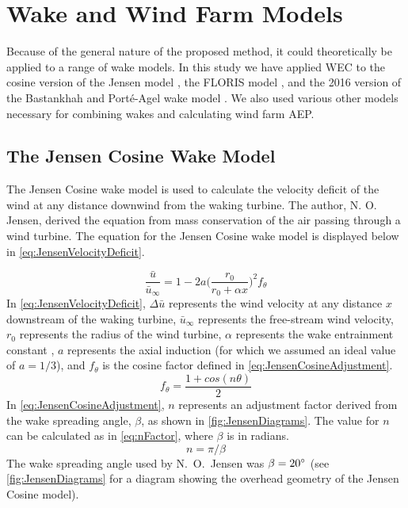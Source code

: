 \documentclass[a4paper]{jpconf}
\begin{document}
\section{Wake and Wind Farm Models}
Because of the general nature of the proposed method, it could theoretically be applied to a range of wake models. In this study we have applied WEC to the cosine version of the Jensen model \cite{jensen1983}, the FLORIS model \cite{gebraad2014,thomas2017-Improving-FLORIS}, and the 2016 version of the Bastankhah and Port\'e-Agel wake model \cite{bastankhah2016}. We also used various other models necessary for combining wakes and calculating wind farm AEP.

\subsection{The Jensen Cosine Wake Model}
The Jensen Cosine wake model is used to calculate the velocity deficit of the wind at any distance downwind from the waking turbine. The author, N. O. Jensen, derived the equation from mass conservation of the air passing through a wind turbine. The equation for the Jensen Cosine wake model is displayed below in \cref{eq:JensenVelocityDeficit}.

\begin{equation}
    \frac{ \bar{u}}{\bar{u}_\infty} = 1 - 2a \bigg(\frac{r_0}{r_0 + \alpha x} \bigg)^2 f_\theta 
    \label{eq:JensenVelocityDeficit}
\end{equation}
%
In \cref{eq:JensenVelocityDeficit}, $\Delta \bar{u}$ represents the wind velocity at any distance $x$ downstream of the waking turbine, $\bar{u}_\infty$ represents the free-stream wind velocity, $r_0$ represents the radius of the wind turbine, $\alpha$ represents the wake entrainment constant \cite{jensen1983}, $a$ represents the axial induction (for which we assumed an ideal value of $a = 1/3$), and $f_\theta$ is the cosine factor defined in \cref{eq:JensenCosineAdjustment}.
%
\begin{equation}
f_\theta = \frac{1 + cos(n\theta)}{2}
\label{eq:JensenCosineAdjustment}
\end{equation}
%
In \cref{eq:JensenCosineAdjustment}, $n$ represents an adjustment factor derived from the wake spreading angle, $\beta$, as shown in \cref{fig:JensenDiagrams}. The value for $n$ can be calculated as in \cref{eq:nFactor}, where $\beta$ is in radians.
%
\begin{equation}
n = \pi / \beta
\label{eq:nFactor}
\end{equation}
%
The wake spreading angle used by N.~O.~Jensen was $\beta = 20 \degree$  \cite{jensen1983} (see \cref{fig:JensenDiagrams} for a diagram showing the overhead geometry of the Jensen Cosine model).
\end{document}
